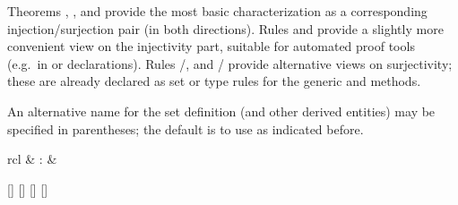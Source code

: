 \begin{isabellebody}
\begin{isamarkuptext}
\begin{description}
  Theorems , , and  provide the most basic characterization as a
  corresponding injection/surjection pair (in both directions).  Rules
   and  provide a slightly
  more convenient view on the injectivity part, suitable for automated
  proof tools (e.g.\ in \hyperlink{attribute.simp}{\mbox{}} or \hyperlink{attribute.iff}{\mbox{}}
  declarations).  Rules /, and
  / provide alternative views
  on surjectivity; these are already declared as set or type rules for
  the generic \hyperlink{method.cases}{\mbox{}} and \hyperlink{method.induct}{\mbox{}} methods.

  An alternative name for the set definition (and other derived
  entities) may be specified in parentheses; the default is to use
   as indicated before.

  \end{description}%
\end{isamarkuptext}%
\isamarkuptrue%
%
\isamarkuptrue%
%
\begin{isamarkuptext}%
\begin{matharray}{rcl}
    \hypertarget{attribute.HOL.split-format}{\hyperlink{attribute.HOL.split-format}{\mbox{}}} & : &  \\
  \end{matharray}

  \begin{railoutput}
[]
\rail@bar
{}
[]
[]
[]
\rail@endbar
\rail@end
\end{railoutput}



\end{isamarkuptext}
\end{isabellebody}
